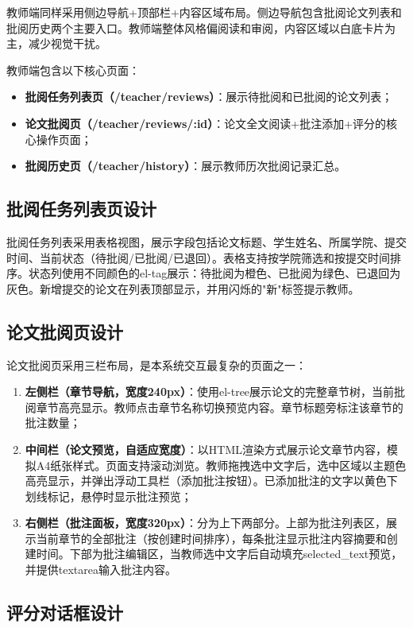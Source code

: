 \documentclass{../softeng}
\begin{document}
教师端同样采用侧边导航+顶部栏+内容区域布局。侧边导航包含批阅论文列表和批阅历史两个主要入口。教师端整体风格偏阅读和审阅，内容区域以白底卡片为主，减少视觉干扰。

教师端包含以下核心页面：
\begin{itemize}
    \item \textbf{批阅任务列表页（/teacher/reviews）}：展示待批阅和已批阅的论文列表；
    \item \textbf{论文批阅页（/teacher/reviews/:id）}：论文全文阅读+批注添加+评分的核心操作页面；
    \item \textbf{批阅历史页（/teacher/history）}：展示教师历次批阅记录汇总。
\end{itemize}

\subsection{批阅任务列表页设计}

批阅任务列表采用表格视图，展示字段包括论文标题、学生姓名、所属学院、提交时间、当前状态（待批阅/已批阅/已退回）。表格支持按学院筛选和按提交时间排序。状态列使用不同颜色的el-tag展示：待批阅为橙色、已批阅为绿色、已退回为灰色。新增提交的论文在列表顶部显示，并用闪烁的"新"标签提示教师。

\subsection{论文批阅页设计}

论文批阅页采用三栏布局，是本系统交互最复杂的页面之一：
\begin{enumerate}
    \item \textbf{左侧栏（章节导航，宽度240px）}：使用el-tree展示论文的完整章节树，当前批阅章节高亮显示。教师点击章节名称切换预览内容。章节标题旁标注该章节的批注数量；
    \item \textbf{中间栏（论文预览，自适应宽度）}：以HTML渲染方式展示论文章节内容，模拟A4纸张样式。页面支持滚动浏览。教师拖拽选中文字后，选中区域以主题色高亮显示，并弹出浮动工具栏（添加批注按钮）。已添加批注的文字以黄色下划线标记，悬停时显示批注预览；
    \item \textbf{右侧栏（批注面板，宽度320px）}：分为上下两部分。上部为批注列表区，展示当前章节的全部批注（按创建时间排序），每条批注显示批注内容摘要和创建时间。下部为批注编辑区，当教师选中文字后自动填充selected\_text预览，并提供textarea输入批注内容。
\end{enumerate}

\subsection{评分对话框设计}
\end{document}
